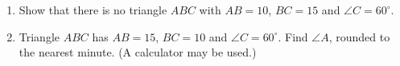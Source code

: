 \begin{enumerate}
\item[(a)] Show that there is no triangle $ABC$ with $AB=10$, $BC=15$ and $\angle C=60^\circ$.
\item[(b)] Triangle $ABC$ has $AB=15$, $BC=10$ and $\angle C=60^\circ$. Find $\angle A$, rounded to the nearest minute. (A calculator may be used.)
\end{enumerate}
